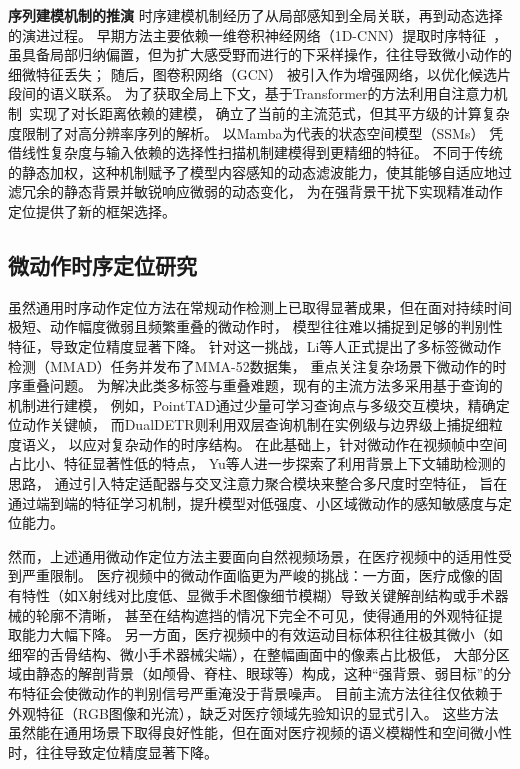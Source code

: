 \textbf{序列建模机制的推演}\quad
时序建模机制经历了从局部感知到全局关联，再到动态选择的演进过程。
早期方法主要依赖一维卷积神经网络（1D-CNN）提取时序特征~\cite{shou2016temporal,lin2017single, xu2020g}，
虽具备局部归纳偏置，但为扩大感受野而进行的下采样操作，往往导致微小动作的细微特征丢失；
随后，图卷积网络（GCN）\cite{zeng2019graph,zhao2021video} 被引入作为增强网络，以优化候选片段间的语义联系。
为了获取全局上下文，基于Transformer的方法利用自注意力机制~\cite{zhang2022actionformer, yang2024adapting}实现了对长距离依赖的建模，
确立了当前的主流范式，但其平方级的计算复杂度限制了对高分辨率序列的解析。
以Mamba为代表的状态空间模型（SSMs）\cite{gu2023mamba, li2024videomamba}
凭借线性复杂度与输入依赖的选择性扫描机制建模得到更精细的特征。
不同于传统的静态加权，这种机制赋予了模型内容感知的动态滤波能力，使其能够自适应地过滤冗余的静态背景并敏锐响应微弱的动态变化，
为在强背景干扰下实现精准动作定位提供了新的框架选择。

\subsection{微动作时序定位研究}

虽然通用时序动作定位方法在常规动作检测上已取得显著成果，但在面对持续时间极短、动作幅度微弱且频繁重叠的微动作时，
模型往往难以捕捉到足够的判别性特征，导致定位精度显著下降。
针对这一挑战，Li等人正式提出了多标签微动作检测（MMAD）任务并发布了MMA-52数据集\cite{li2025mmad}，
重点关注复杂场景下微动作的时序重叠问题。
为解决此类多标签与重叠难题，现有的主流方法多采用基于查询的机制进行建模，
例如，PointTAD\cite{tan2022pointtad}通过少量可学习查询点与多级交互模块，精确定位动作关键帧，
而DualDETR\cite{zhu2024dual}则利用双层查询机制在实例级与边界级上捕捉细粒度语义，
以应对复杂动作的时序结构。
在此基础上，针对微动作在视频帧中空间占比小、特征显著性低的特点，
Yu等人\cite{yu2024end}进一步探索了利用背景上下文辅助检测的思路，
通过引入特定适配器与交叉注意力聚合模块来整合多尺度时空特征，
旨在通过端到端的特征学习机制，提升模型对低强度、小区域微动作的感知敏感度与定位能力。

然而，上述通用微动作定位方法主要面向自然视频场景，在医疗视频中的适用性受到严重限制。
医疗视频中的微动作面临更为严峻的挑战：一方面，医疗成像的固有特性（如X射线对比度低、显微手术图像细节模糊）导致关键解剖结构或手术器械的轮廓不清晰，
甚至在结构遮挡的情况下完全不可见，使得通用的外观特征提取能力大幅下降。
另一方面，医疗视频中的有效运动目标体积往往极其微小（如细窄的舌骨结构、微小手术器械尖端），在整幅画面中的像素占比极低，
大部分区域由静态的解剖背景（如颅骨、脊柱、眼球等）构成，这种``强背景、弱目标''的分布特征会使微动作的判别信号严重淹没于背景噪声。
目前主流方法往往仅依赖于外观特征（RGB图像和光流），缺乏对医疗领域先验知识的显式引入。
这些方法虽然能在通用场景下取得良好性能，但在面对医疗视频的语义模糊性和空间微小性时，往往导致定位精度显著下降。

